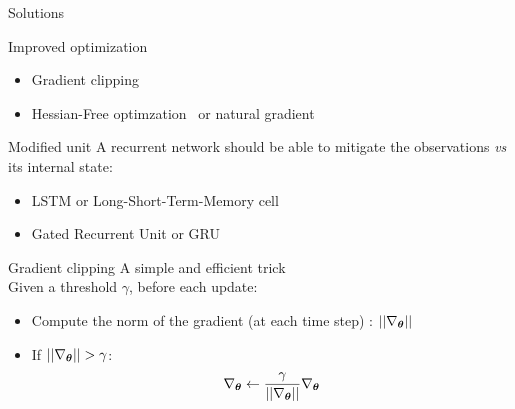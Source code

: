 \begin{frame}{Solutions}
  \begin{block}{Improved optimization}
    \begin{itemize}
    \item Gradient clipping~\cite{Pascanu13Difficulty} 
    \item Hessian-Free optimzation~\cite{Martens12HF} or natural gradient~\cite{Desjardins13Natural,Ollivier15Riemannian}
    \end{itemize}
  \end{block}
  \begin{block}{Modified unit}
    A recurrent network should be able to mitigate the observations \textit{vs} its internal state: 
    \begin{itemize}
    \item LSTM or Long-Short-Term-Memory cell~\cite{Hochreiter97LSTM,Graves09Offline}
    \item  Gated Recurrent Unit or GRU~\cite{Cho14Learning}
    \end{itemize}
  \end{block}
\end{frame}


\begin{frame}{Gradient clipping}
A simple and efficient trick\\
Given a threshold $\gamma$, before each update: 
\begin{itemize}
\item Compute the norm of the gradient (at each time step) :   $||\nabla_{\boldsymbol{\theta}}||$
\item If  $ ||\nabla_{\boldsymbol{\theta}}|| > \gamma$: 
$$ \nabla_{\boldsymbol{\theta}} \leftarrow \frac{\gamma}{||\nabla_{\boldsymbol{\theta}}|| } \nabla_{\boldsymbol{\theta}} 
$$
\end{itemize}
\end{frame}

